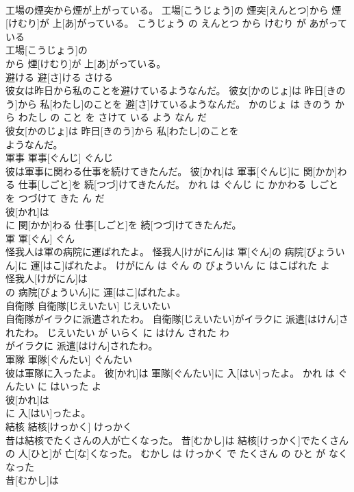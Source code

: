 \documentclass[8pt]{extreport}
\begin{document}
\begin{CJK}{UTF8}{min}
\\	工場の煙突から煙が上がっている。	工場[こうじょう]の 煙突[えんとつ]から 煙[けむり]が 上[あ]がっている。	こうじょう の えんとつ から けむり が あがって いる	
\\	工場[こうじょう]の
\\	から 煙[けむり]が 上[あ]がっている。			
\\	避ける	避[さ]ける	さける	
\\	彼女は昨日から私のことを避けているようなんだ。	彼女[かのじょ]は 昨日[きのう]から 私[わたし]のことを 避[さ]けているようなんだ。	かのじょ は きのう から わたし の こと を さけて いる よう なん だ	
\\	彼女[かのじょ]は 昨日[きのう]から 私[わたし]のことを
\\	ようなんだ。			
\\	軍事	軍事[ぐんじ]	ぐんじ	
\\	彼は軍事に関わる仕事を続けてきたんだ。	彼[かれ]は 軍事[ぐんじ]に 関[かか]わる 仕事[しごと]を 続[つづ]けてきたんだ。	かれ は ぐんじ に かかわる しごと を つづけて きた ん だ	
\\	彼[かれ]は
\\	に 関[かか]わる 仕事[しごと]を 続[つづ]けてきたんだ。			
\\	軍	軍[ぐん]	ぐん	
\\	怪我人は軍の病院に運ばれたよ。	怪我人[けがにん]は 軍[ぐん]の 病院[びょういん]に 運[はこ]ばれたよ。	けがにん は ぐん の びょういん に はこばれた よ	
\\	怪我人[けがにん]は
\\	の 病院[びょういん]に 運[はこ]ばれたよ。			
\\	自衛隊	自衛隊[じえいたい]	じえいたい	
\\	自衛隊がイラクに派遣されたわ。	自衛隊[じえいたい]がイラクに 派遣[はけん]されたわ。	じえいたい が いらく に はけん された わ	
\\	がイラクに 派遣[はけん]されたわ。			
\\	軍隊	軍隊[ぐんたい]	ぐんたい	
\\	彼は軍隊に入ったよ。	彼[かれ]は 軍隊[ぐんたい]に 入[はい]ったよ。	かれ は ぐんたい に はいった よ	
\\	彼[かれ]は
\\	に 入[はい]ったよ。			
\\	結核	結核[けっかく]	けっかく	
\\	昔は結核でたくさんの人が亡くなった。	昔[むかし]は 結核[けっかく]でたくさんの 人[ひと]が 亡[な]くなった。	むかし は けっかく で たくさん の ひと が なくなった	
\\	昔[むかし]は

\end{CJK}
\end{document}
